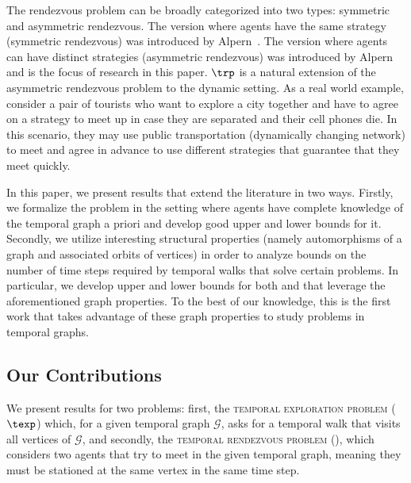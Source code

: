 The rendezvous problem can be broadly categorized into two types: symmetric and
asymmetric rendezvous. The version where agents have the same strategy
(symmetric rendezvous) was introduced by Alpern~\cite{Alpern76}. The version
where agents can have distinct strategies (asymmetric rendezvous) was introduced
by Alpern~\cite{Alpern95} and is the focus of research in this paper. 
$\trp$ is a natural
extension of the asymmetric rendezvous problem to the dynamic setting. As a real
world example, consider a pair of tourists who want to explore a city together
and have to agree on a strategy to meet up in case they are separated and their
cell phones die. In this scenario, they may use public transportation
(dynamically changing network) to meet and agree in advance to use different
strategies that guarantee that they meet quickly. 

In this paper, we present results that extend the literature in two ways.
Firstly, we formalize the \trp{} problem in the setting where agents have
complete knowledge of the temporal graph a priori and develop good upper and
lower bounds for it. 
Secondly, we
utilize interesting structural properties (namely automorphisms of a graph and
associated orbits of  vertices) in order to analyze 
bounds on the number of time steps required by temporal walks that solve certain problems.
In particular, we develop upper and lower bounds for both \texp{} and \trp{} that leverage the 
aforementioned graph properties. To the best of our knowledge, this is the first work that takes 
advantage of these graph properties to study problems in temporal graphs. 

\subsection{Our Contributions}
\label{subsec:our-contribs}
We present results for two problems: first, the \textsc{temporal exploration
problem} ($\texp$) which, for a given temporal graph $\mathcal{G}$, asks for a
temporal walk that visits all vertices of $\mathcal{G}$, and secondly, the
\textsc{temporal rendezvous problem} (\trp), which considers two agents that try
to meet in the given temporal graph, meaning they must be stationed at the same
vertex in the same time step.

